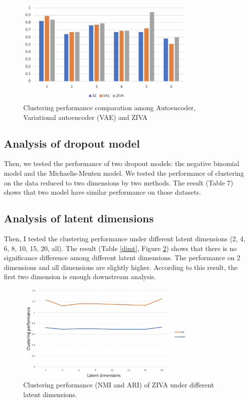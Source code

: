 \begin{figure}[htb!]
    \centering
    \includegraphics[width=0.8\textwidth]{figures/myfigures/3aeclu.png}
    \caption{Clustering performance comparation among Autoencoder, Variational autoencoder (VAE) and ZIVA}
    \label{3aeclu}
\end{figure}
\subsection{Analysis of dropout model}
Then, we tested the performance of two dropout models: the negative binomial model and the Michaelis-Menten model. We tested the performance of clustering on the data reduced to two dimensions by two methods. The result (Table 7) shows that two model have similar performance on those datasets.



\subsection{Analysis of latent dimensions}
Then, I tested the clustering performance under different latent dimensions (2, 4, 6, 8, 10, 15, 20, all). The result (Table \ref{dimt}, Figure \ref{dim}) shows that there is no significance difference among different latent dimensions. The performance on 2 dimensions and all dimensions are slightly higher. According to this result, the first two dimension is enough downstream analysis.
\begin{figure}[htb!]
    \centering
    \includegraphics[width=0.8\textwidth]{figures/myfigures/dim.png}
    \caption{Clustering performance (NMI and ARI) of ZIVA under different latent dimensions.}
    \label{dim}
\end{figure}
